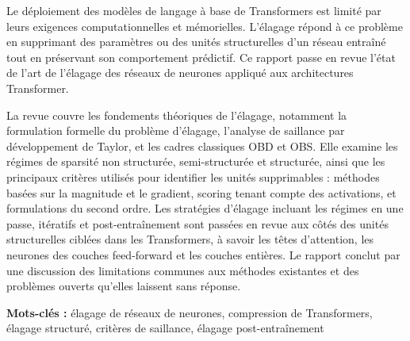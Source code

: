Le déploiement des modèles de langage à base de Transformers est limité par leurs exigences computationnelles et mémorielles. L'élagage répond à ce problème en supprimant des paramètres ou des unités structurelles d'un réseau entraîné tout en préservant son comportement prédictif. Ce rapport passe en revue l'état de l'art de l'élagage des réseaux de neurones appliqué aux architectures Transformer.

La revue couvre les fondements théoriques de l'élagage, notamment la formulation formelle du problème d'élagage, l'analyse de saillance par développement de Taylor, et les cadres classiques OBD et OBS. Elle examine les régimes de sparsité non structurée, semi-structurée et structurée, ainsi que les principaux critères utilisés pour identifier les unités supprimables : méthodes basées sur la magnitude et le gradient, scoring tenant compte des activations, et formulations du second ordre. Les stratégies d'élagage incluant les régimes en une passe, itératifs et post-entraînement sont passées en revue aux côtés des unités structurelles ciblées dans les Transformers, à savoir les têtes d'attention, les neurones des couches feed-forward et les couches entières. Le rapport conclut par une discussion des limitations communes aux méthodes existantes et des problèmes ouverts qu'elles laissent sans réponse.

\vspace{1em}
\noindent\textbf{Mots-clés :} élagage de réseaux de neurones, compression de Transformers, élagage structuré, critères de saillance, élagage post-entraînement

\clearpage

\fi

\ifPDFTeX
